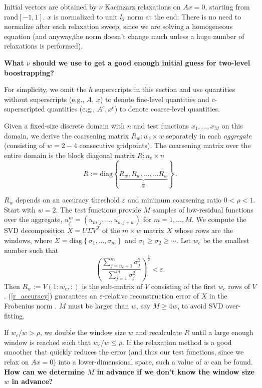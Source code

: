 \documentclass{article}
\begin{document}
Initial vectors are obtained by $\nu$ Kacmzarz relaxations on $A x = 0$, starting from $\text{rand}[-1, 1]$. $x$ is normalized to unit $l_2$ norm at the end. There is no need to normalize after each relaxation sweep, since we are solving a homogeneous equation (and anyway,the norm doesn't change much unless a huge number of relaxations is performed). 

{\bf What $\nu$ should we use to get a good enough initial guess for two-level boostrapping?}

For simplicity, we omit the $h$ superscripts in this section and use quantities without superscripts (e.g., $A$, $x$) to denote fine-level quantities and $c$-superscripted quantities (e.g., $A^c, x^c$) to denote coarse-level quantities.

Given a fixed-size discrete domain with $n$ and test functions $x_1,\dots,x_M$ on this domain, we derive the coarsening matrix $R_w: w_c \times w$ separately in each \emph{aggregate} (consisting of $w = 2-4$ consecutive gridpoints). The coarsening matrix over the entire domain is the block diagonal matrix $R: n_c \times n$
\begin{equation}
	R := \text{diag} \left\{ \underbrace{R_w, R_w, \dots, ... R_w }_{\frac{n}{w}}  \right\} \,.
\end{equation}

$R_w$ depends on an accuracy threshold $\varepsilon$ and minimum coarsening ratio $0 < \rho < 1$. Start with $w = 2$. The test functions provide $M$ samples of low-residual functions over the aggregate, $u^m_j= (u_{m,j},\dots,u_{k,j+w})$ for $m = 1,\dots,M$. We compute the SVD decomposition $X = U \Sigma V^T$ of the $m \times w$ matrix $X$ whose rows are the windows, where $\Sigma = \text{diag}\left\{\sigma_1, \dots, \sigma_m \right\}$ and $\sigma_1 \geq \sigma_2 \geq \cdots$. Let $w_c$ be the smallest number such that
\begin{equation}
	\left(\frac{\sum_{j=n_c+1}^m \sigma_j^2}{\sum_{j=1}^m \sigma_j^2 } \right)^{\frac12} < \varepsilon.
	\label{r_accuracy}
\end{equation}
Then $R_w := V(1:w_c,:)$ is the sub-matrix of $V$ consisting of the first $w_c$ rows of $V$. (\ref{r_accuracy}) guarantees an $\varepsilon$-relative reconstruction error of $X$ in the Frobenius norm \cite{svd}. $M$ must be larger than $w$, say $M \geq 4 w$, to avoid SVD over-fitting.

If $w_c/w > \rho$, we double the window size $w$ and recalculate $R$ until a large enough window is reached such that $w_c/w \leq \rho$. If the relaxation method is a good smoother that quickly reduces the error (and thus our test functions, since we relax on $A x = 0$) into a lower-dimensional space, such a value of $w$ can be found.  {\bf How can we determine $M$ in advance if we don't know the window size $w$ in advance?}
\end{document}
